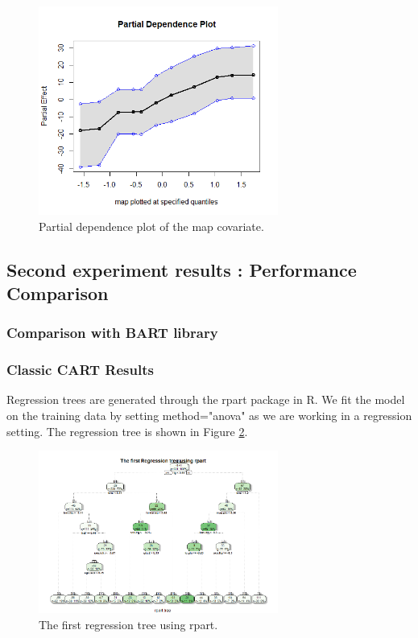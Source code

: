 \documentclass{usiinftr}
\begin{document}
\begin{figure}[h!] 
\centering
\includegraphics[width=0.7\textwidth]{images/PD_map.png}
\caption{Partial dependence plot of the map covariate.}
\label{PDmap}
\end{figure}

\subsection{Second experiment results : Performance Comparison}
\subsubsection{Comparison with BART library}


\subsubsection{Classic CART Results}
Regression trees are generated through the rpart package in R. We fit the model on the training data by setting method="anova" as we are working in a regression setting. The regression tree is shown in Figure \ref{CART1}. 

\begin{figure}[h!] 
\centering
\includegraphics[width=0.7\textwidth]{images/image107.png}
\caption{The first regression tree using rpart.}
\label{CART1}
\end{figure}
\end{document}
